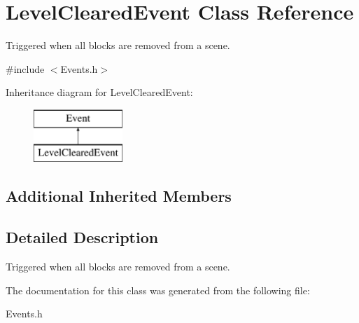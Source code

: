 \hypertarget{classLevelClearedEvent}{\section{Level\-Cleared\-Event Class Reference}
\label{classLevelClearedEvent}
}


Triggered when all blocks are removed from a scene.  




{\ttfamily \#include $<$Events.\-h$>$}

Inheritance diagram for Level\-Cleared\-Event\-:\begin{figure}[H]
\begin{center}
\leavevmode
\includegraphics[height=2.000000cm]{classLevelClearedEvent}
\end{center}
\end{figure}
\subsection*{Additional Inherited Members}


\subsection{Detailed Description}
Triggered when all blocks are removed from a scene. 

The documentation for this class was generated from the following file\-:\begin{DoxyCompactItemize}
\item 
Events.\-h\end{DoxyCompactItemize}
